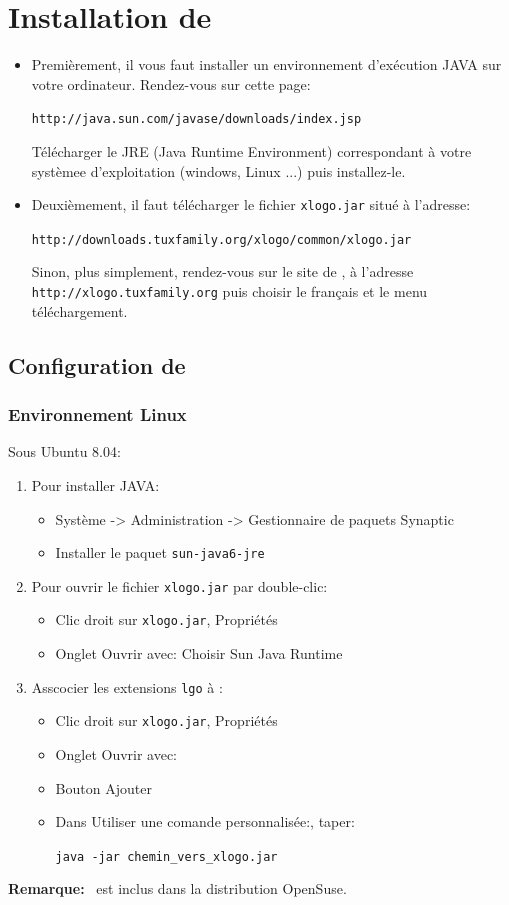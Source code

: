 \chapter{Installation de \xlogo}
\noindent 
\begin{itemize}
 \item Premièrement, il vous faut installer un environnement d'exécution JAVA sur votre ordinateur. Rendez-vous sur cette page:
\begin{center}
 \texttt{http://java.sun.com/javase/downloads/index.jsp}
\end{center}
Télécharger le JRE (Java Runtime Environment) correspondant à votre systèmee d’exploitation (windows, Linux ...) puis installez-le.
\item Deuxièmement, il faut télécharger le fichier \texttt{xlogo.jar} situé à l'adresse:
\begin{center}
 \texttt{http://downloads.tuxfamily.org/xlogo/common/xlogo.jar}
\end{center}
Sinon, plus simplement, rendez-vous sur le site de \xlogo, à l'adresse \texttt{http://xlogo.tuxfamily.org} puis choisir le français et le menu téléchargement.
\end{itemize}
\section{Configuration de \xlogo}
\subsection{Environnement Linux}
Sous Ubuntu 8.04:
\begin{enumerate}
 \item Pour installer JAVA:
\begin{itemize}
 \item Système -> Administration -> Gestionnaire de paquets Synaptic
 \item Installer le paquet \texttt{sun-java6-jre}
\end{itemize}
 \item  Pour ouvrir le fichier \texttt{xlogo.jar} par double-clic:
\begin{itemize}
 \item Clic droit sur \texttt{xlogo.jar}, Propriétés
 \item Onglet \og Ouvrir avec\fg: Choisir Sun Java Runtime 
\end{itemize}
 \item Asscocier les extensions \texttt{lgo} à \xlogo:
\begin{itemize}
 \item Clic droit sur \texttt{xlogo.jar}, Propriétés
 \item Onglet \og Ouvrir avec\fg:
 \item Bouton \og Ajouter \fg
 \item Dans \og Utiliser une comande personnalisée:\fg, taper:
\begin{center}
\texttt{java -jar chemin\_vers\_xlogo.jar} 
\end{center}
\end{itemize}
\end{enumerate}
\textbf{Remarque:} \xlogo\ est inclus dans la distribution OpenSuse.
